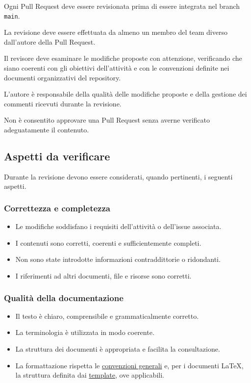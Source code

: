 \documentclass[11pt, a4paper]{article}
\begin{document}
Ogni Pull Request deve essere revisionata prima di essere integrata nel branch \texttt{main}.

La revisione deve essere effettuata da almeno un membro del team diverso dall'autore della Pull Request.

Il revisore deve esaminare le modifiche proposte con attenzione, verificando che siano coerenti con gli obiettivi dell'attività e con le convenzioni definite nei documenti organizzativi del repository.

L'autore è responsabile della qualità delle modifiche proposte e della gestione dei commenti ricevuti durante la revisione.

Non è consentito approvare una Pull Request senza averne verificato adeguatamente il contenuto.

\subsection{Aspetti da verificare}

Durante la revisione devono essere considerati, quando pertinenti, i seguenti aspetti.

\subsubsection{Correttezza e completezza}

\begin{itemize}
    \item Le modifiche soddisfano i requisiti dell'attività o dell'issue associata.
    \item I contenuti sono corretti, coerenti e sufficientemente completi.
    \item Non sono state introdotte informazioni contraddittorie o ridondanti.
    \item I riferimenti ad altri documenti, file e risorse sono corretti.
\end{itemize}

\subsubsection{Qualità della documentazione}

\begin{itemize}
    \item Il testo è chiaro, comprensibile e grammaticalmente corretto.
    \item La terminologia è utilizzata in modo coerente.
    \item La struttura dei documenti è appropriata e facilita la consultazione.
    \item La formattazione rispetta le \hyperref[subsec:formattazione-del-testo]{convenzioni generali} e, per i documenti LaTeX, la struttura definita dai \href{https://github.com/On-By-One-Team/On-By-One.github.io/blob/main/docs/tex/templates}{template}, ove applicabili.
\end{itemize}
\end{document}
